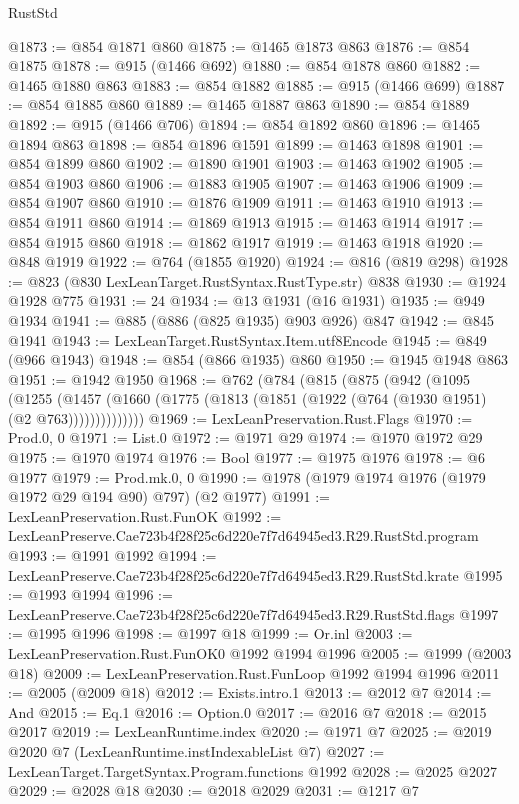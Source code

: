 \begin{lexlean}{RustStd}
\begin{coremodule}
@1873 := @854 @1871 @860
@1875 := @1465 @1873 @863
@1876 := @854 @1875
@1878 := @915 (@1466 @692)
@1880 := @854 @1878 @860
@1882 := @1465 @1880 @863
@1883 := @854 @1882
@1885 := @915 (@1466 @699)
@1887 := @854 @1885 @860
@1889 := @1465 @1887 @863
@1890 := @854 @1889
@1892 := @915 (@1466 @706)
@1894 := @854 @1892 @860
@1896 := @1465 @1894 @863
@1898 := @854 @1896 @1591
@1899 := @1463 @1898
@1901 := @854 @1899 @860
@1902 := @1890 @1901
@1903 := @1463 @1902
@1905 := @854 @1903 @860
@1906 := @1883 @1905
@1907 := @1463 @1906
@1909 := @854 @1907 @860
@1910 := @1876 @1909
@1911 := @1463 @1910
@1913 := @854 @1911 @860
@1914 := @1869 @1913
@1915 := @1463 @1914
@1917 := @854 @1915 @860
@1918 := @1862 @1917
@1919 := @1463 @1918
@1920 := @848 @1919
@1922 := @764 (@1855 @1920)
@1924 := @816 (@819 @298)
@1928 := @823 (@830 LexLeanTarget.RustSyntax.RustType.str) @838
@1930 := @1924 @1928 @775
@1931 := 24
@1934 := @13 @1931 (@16 @1931)
@1935 := @949 @1934
@1941 := @885 (@886 (@825 @1935) @903 @926) @847
@1942 := @845 @1941
@1943 := LexLeanTarget.RustSyntax.Item.utf8Encode
@1945 := @849 (@966 @1943)
@1948 := @854 (@866 @1935) @860
@1950 := @1945 @1948 @863
@1951 := @1942 @1950
@1968 := @762
    (@784
      (@815
        (@875
          (@942
            (@1095
              (@1255
                (@1457 (@1660 (@1775 (@1813 (@1851 (@1922 (@764 (@1930 @1951) (@2 @763))))))))))))))
@1969 := LexLeanPreservation.Rust.Flags
@1970 := Prod.{0, 0}
@1971 := List.{0}
@1972 := @1971 @29
@1974 := @1970 @1972 @29
@1975 := @1970 @1974
@1976 := Bool
@1977 := @1975 @1976
@1978 := @6 @1977
@1979 := Prod.mk.{0, 0}
@1990 := @1978 (@1979 @1974 @1976 (@1979 @1972 @29 @194 @90) @797) (@2 @1977)
@1991 := LexLeanPreservation.Rust.FunOK
@1992 := LexLeanPreserve.Cae723b4f28f25c6d220e7f7d64945ed3.R29.RustStd.program
@1993 := @1991 @1992
@1994 := LexLeanPreserve.Cae723b4f28f25c6d220e7f7d64945ed3.R29.RustStd.krate
@1995 := @1993 @1994
@1996 := LexLeanPreserve.Cae723b4f28f25c6d220e7f7d64945ed3.R29.RustStd.flags
@1997 := @1995 @1996
@1998 := @1997 @18
@1999 := Or.inl
@2003 := LexLeanPreservation.Rust.FunOK0 @1992 @1994 @1996
@2005 := @1999 (@2003 @18)
@2009 := LexLeanPreservation.Rust.FunLoop @1992 @1994 @1996
@2011 := @2005 (@2009 @18)
@2012 := Exists.intro.{1}
@2013 := @2012 @7
@2014 := And
@2015 := Eq.{1}
@2016 := Option.{0}
@2017 := @2016 @7
@2018 := @2015 @2017
@2019 := LexLeanRuntime.index
@2020 := @1971 @7
@2025 := @2019 @2020 @7 (LexLeanRuntime.instIndexableList @7)
@2027 := LexLeanTarget.TargetSyntax.Program.functions @1992
@2028 := @2025 @2027
@2029 := @2028 @18
@2030 := @2018 @2029
@2031 := @1217 @7

\end{coremodule}
\end{lexlean}
